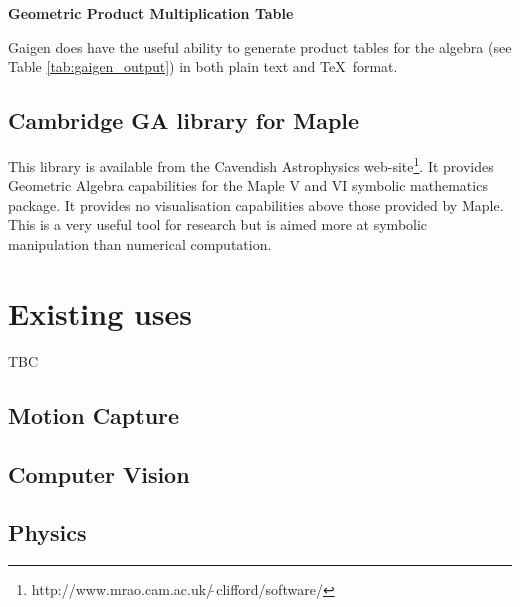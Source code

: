 \begin{table}
\centering
\textbf{Geometric Product Multiplication Table}\\
\rule{0cm}{0.3cm}

\caption{Example \TeX\ output from Gaigen\label{tab:gaigen_output}}
\end{table}

Gaigen does have the useful ability to generate product tables for the algebra
(see Table \ref{tab:gaigen_output}) in both plain text and \TeX\ format. 


\subsection{Cambridge GA library for Maple}

This library is available from the Cavendish Astrophysics
web-site\footnote{http://www.mrao.cam.ac.uk/$\tilde{\ }$clifford/software/}. It
provides Geometric Algebra capabilities for the Maple V and VI symbolic mathematics
package. It provides no visualisation capabilities above those provided by
Maple. This is a very useful tool for research but is aimed more at symbolic
manipulation than numerical computation.

\section{Existing uses}

TBC

\subsection{Motion Capture}
\subsection{Computer Vision}
\subsection{Physics}
